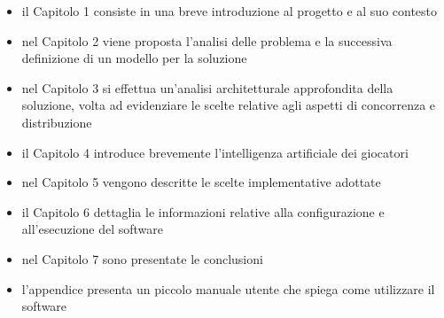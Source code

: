 \begin{itemize}
	\item il Capitolo 1 consiste in una breve introduzione al progetto e al suo contesto
	\item nel Capitolo 2 viene proposta l'analisi delle problema e la successiva definizione di un modello per la soluzione
	\item nel Capitolo 3 si effettua un'analisi architetturale approfondita della soluzione, volta ad evidenziare le scelte relative agli aspetti di concorrenza e distribuzione
	\item il Capitolo 4 introduce brevemente l'intelligenza artificiale dei giocatori
	\item nel Capitolo 5 vengono descritte le scelte implementative adottate
	\item il Capitolo 6 dettaglia le informazioni relative alla configurazione e all'esecuzione del software
	\item nel Capitolo 7 sono presentate le conclusioni
	\item l'appendice presenta un piccolo manuale utente che spiega come utilizzare il software
\end{itemize}
